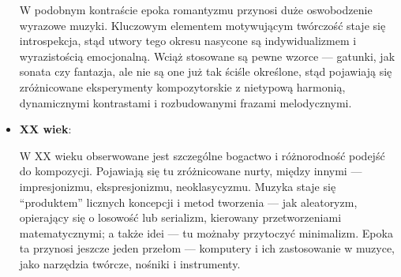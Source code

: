 \begin{itemize}
	      W podobnym kontraście epoka romantyzmu przynosi duże oswobodzenie wyrazowe muzyki.
	      Kluczowym elementem motywującym twórczość staje się introspekcja, stąd utwory tego okresu nasycone są indywidualizmem
	      i wyrazistością emocjonalną.
	      Wciąż stosowane są pewne wzorce — gatunki, jak sonata czy fantazja, ale nie są one już tak ściśle określone,
	      stąd pojawiają się zróżnicowane eksperymenty kompozytorskie z nietypową harmonią, dynamicznymi kontrastami i rozbudowanymi
	      frazami melodycznymi.
	\item \textbf{XX wiek}:

	      W XX wieku obserwowane jest szczególne bogactwo i różnorodność podejść do kompozycji.
	      Pojawiają się tu zróżnicowane nurty, między innymi — impresjonizmu, ekspresjonizmu, neoklasycyzmu.
	      Muzyka staje się \enquote{produktem} licznych koncepcji i metod tworzenia — jak aleatoryzm, opierający
	      się o losowość lub serializm, kierowany przetworzeniami matematycznymi; a także idei — tu możnaby przytoczyć minimalizm.
	      Epoka ta przynosi jeszcze jeden przełom — komputery i ich zastosowanie w muzyce, jako narzędzia twórcze, nośniki i instrumenty.
\end{itemize}

